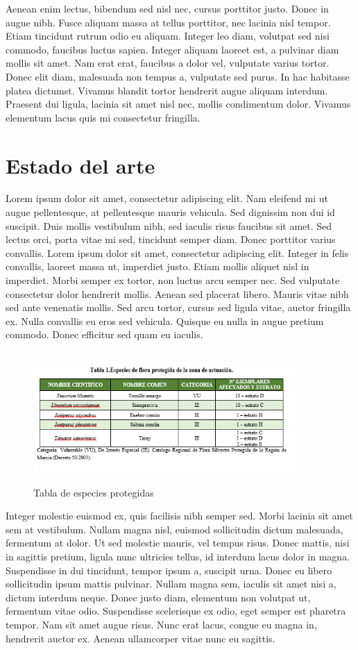 \documentclass[a4paper,11pt]{article}
\begin{document}
Aenean enim lectus, bibendum sed nisl nec, cursus porttitor justo. Donec in augue nibh. Fusce aliquam massa at tellus porttitor, nec lacinia nisl tempor. Etiam tincidunt rutrum odio eu aliquam. Integer leo diam, volutpat sed nisi commodo, faucibus luctus sapien. Integer aliquam laoreet est, a pulvinar diam mollis sit amet. Nam erat erat, faucibus a dolor vel, vulputate varius tortor. Donec elit diam, malesuada non tempus a, vulputate sed purus. In hac habitasse platea dictumst. Vivamus blandit tortor hendrerit augue aliquam interdum. Praesent dui ligula, lacinia sit amet nisl nec, mollis condimentum dolor. Vivamus elementum lacus quis mi consectetur fringilla.

\part{Estado del arte}

Lorem ipsum dolor sit amet, consectetur adipiscing elit. Nam eleifend mi ut augue pellentesque, at pellentesque mauris vehicula. Sed dignissim non dui id suscipit. Duis mollis vestibulum nibh, sed iaculis risus faucibus sit amet. Sed lectus orci, porta vitae mi sed, tincidunt semper diam. Donec porttitor varius convallis. Lorem ipsum dolor sit amet, consectetur adipiscing elit. Integer in felis convallis, laoreet massa ut, imperdiet justo. Etiam mollis aliquet nisl in imperdiet. Morbi semper ex tortor, non luctus arcu semper nec. Sed vulputate consectetur dolor hendrerit mollis. Aenean sed placerat libero. Mauris vitae nibh sed ante venenatis mollis. Sed arcu tortor, cursus sed ligula vitae, auctor fringilla ex. Nulla convallis eu eros sed vehicula. Quisque eu nulla in augue pretium commodo. Donec efficitur sed quam eu iaculis.

\begin{figure}[h]
	\centering
	\includegraphics[width=100mm,height=50mm]{figura2}
	\caption{Tabla de especies protegidas}
	\label{Figura}
\end{figure}

Integer molestie euismod ex, quis facilisis nibh semper sed. Morbi lacinia sit amet sem at vestibulum. Nullam magna nisl, euismod sollicitudin dictum malesuada, fermentum at dolor. Ut sed molestie mauris, vel tempus risus. Donec mattis, nisi in sagittis pretium, ligula nunc ultricies tellus, id interdum lacus dolor in magna. Suspendisse in dui tincidunt, tempor ipsum a, suscipit urna. Donec eu libero sollicitudin ipsum mattis pulvinar. Nullam magna sem, iaculis sit amet nisi a, dictum interdum neque. Donec justo diam, elementum non volutpat ut, fermentum vitae odio. Suspendisse scelerisque ex odio, eget semper est pharetra tempor. Nam sit amet augue risus. Nunc erat lacus, congue eu magna in, hendrerit auctor ex. Aenean ullamcorper vitae nunc eu sagittis.
\end{document}
